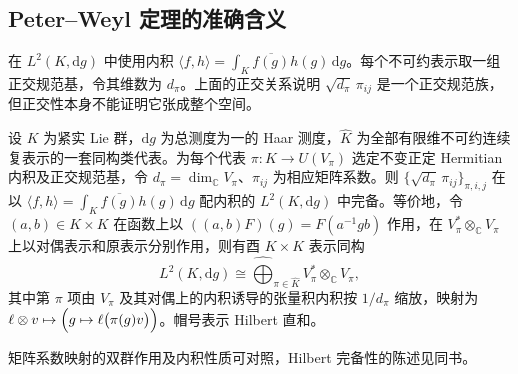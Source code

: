 \subsection{Peter--Weyl 定理的准确含义}
\label{b5:subsec:C02:02}

在 \(L^2(K,\mathrm{d}g)\) 中使用内积 \(\langle f,h\rangle=\int_K\overline{f(g)}h(g)\,\mathrm{d}g\)。每个不可约表示取一组正交规范基，令其维数为 \(d_\pi\)。上面的正交关系说明 \(\sqrt{d_\pi}\,\pi_{ij}\) 是一个正交规范族，但正交性本身不能证明它张成整个空间。

\begin{theorem}\label{b5:thm:peter-weyl}
	设 \(K\) 为紧实 Lie 群，\(\mathrm{d}g\) 为总测度为一的 Haar 测度，\(\widehat K\) 为全部有限维不可约连续复表示的一套同构类代表。为每个代表 \(\pi:K\to U(V_\pi)\) 选定不变正定 Hermitian 内积及正交规范基，令 \(d_\pi=\dim_{\mathbb C}V_\pi\)、\(\pi_{ij}\) 为相应矩阵系数。则 \(\{\sqrt{d_\pi}\,\pi_{ij}\}_{\pi,i,j}\) 在以 \(\langle f,h\rangle=\int_K\overline{f(g)}h(g)\,\mathrm{d}g\) 配内积的 \(L^2(K,\mathrm{d}g)\) 中完备。等价地，令 \((a,b)\in K\times K\) 在函数上以 \(((a,b)F)(g)=F(a^{-1}gb)\) 作用，在 \(V_\pi^*\otimes_{\mathbb C}V_\pi\) 上以对偶表示和原表示分别作用，则有酉 \(K\times K\) 表示同构
	\[
		L^2(K,\mathrm{d}g)\cong\widehat{\bigoplus}_{\pi\in\widehat K}V_\pi^*\otimes_{\mathbb C}V_\pi,
	\]
	其中第 \(\pi\) 项由 \(V_\pi\) 及其对偶上的内积诱导的张量积内积按 \(1/d_\pi\) 缩放，映射为 \(\ell\otimes v\mapsto\Bigl(g\mapsto\ell\bigl(\pi(g)v\bigr)\Bigr)\)。帽号表示 Hilbert 直和。
\end{theorem}

矩阵系数映射的双群作用及内积性质可对照\cite[Section 4.7, Theorem 4.47]{Kirillov2008LieGroups}，Hilbert 完备性的陈述见同书\cite[Theorem 4.49]{Kirillov2008LieGroups}。

